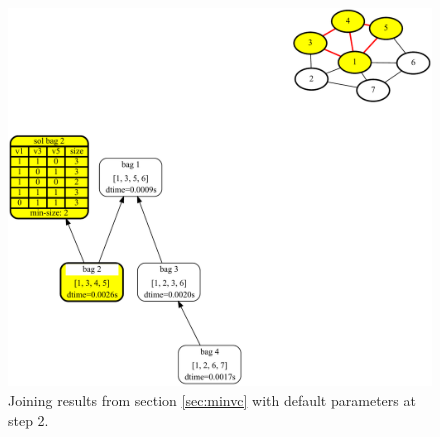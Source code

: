 \documentclass[a4paper, 12pt, bibliography=totoc]{scrartcl}
\begin{document}
\begin{figure}[H]
	\centering
	\includegraphics[width=\linewidth,height=0.6\textheight,keepaspectratio]{images/SVGJOIN/default2.pdf}
	\caption{Joining results from section \ref{sec:minvc} with default parameters at step 2.}
	\label{fig:joindefault}
\end{figure}
\end{document}

